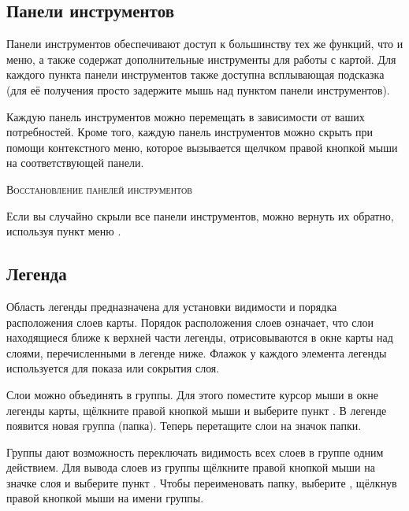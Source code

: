 
\subsection{Панели инструментов}\label{label_toolbars}

Панели инструментов обеспечивают доступ к большинству тех же функций,
что и меню, а также содержат дополнительные инструменты для работы с
картой. Для каждого пункта панели инструментов также доступна всплывающая
подсказка (для её получения просто задержите мышь над пунктом панели инструментов).

Каждую панель инструментов можно перемещать в зависимости от ваших
потребностей. Кроме того, каждую панель инструментов можно скрыть при
помощи контекстного меню, которое вызывается щелчком правой кнопкой мыши
на соответствующей панели.

\begin{Tip}
\caption{\textsc{Восстановление панелей инструментов}} 
Если вы случайно скрыли все панели инструментов, можно вернуть их обратно,
используя пункт меню  \arrow {}.
\end{Tip}

\subsection{Легенда}\label{label_legend}

Область легенды предназначена для установки видимости и порядка
расположения слоев карты. Порядок расположения слоев означает, что слои
находящиеся ближе к верхней части легенды, отрисовываются в окне карты
над слоями, перечисленными в легенде ниже. Флажок у каждого элемента
легенды используется для показа или сокрытия слоя.

Слои можно объединять в группы. Для этого поместите курсор мыши в окне
легенды карты, щёлкните правой кнопкой мыши и выберите пункт
. В легенде появится новая группа (папка).
Теперь перетащите слои на значок папки.

Группы дают возможность переключать видимость всех слоев в группе одним действием.
Для вывода слоев из группы щёлкните правой кнопкой мыши на значке слоя и выберите
пункт . Чтобы переименовать
папку, выберите , щёлкнув правой кнопкой мыши на
имени группы.

